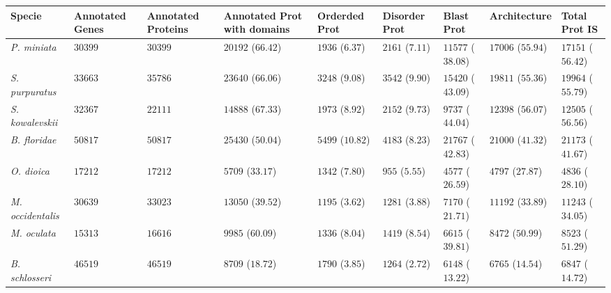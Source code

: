 \documentclass[11pt]{article}
\begin{document}
\begin{table}
\small
\centering
\begin{tabular}{p{3.2cm}p{2cm}p{2cm}p{2cm}p{2cm}p{2cm}p{2.1cm}p{2.7cm}p{2.6cm}}
\toprule
\textbf{Specie}&\textbf{Annotated Genes}&\textbf{Annotated Proteins}&\textbf{Annotated Prot with domains}&\textbf{Orderded Prot}&\textbf{Disorder Prot}&\textbf{Blast Prot}&\textbf{Architecture}&\textbf{Total Prot IS} \\ 
\midrule
\textsl{P. miniata}&$30399$&$30399$&$20192$ ($66.42$)&$1936$ ($6.37$)&$2161$ ($7.11$)&$11577$ ($38.08$)&$17006$ ($55.94$)&$17151$ ($56.42$)\\
\textsl{S. purpuratus}&$33663$&$35786$&$23640$ ($66.06$)&$3248$ ($9.08$)&$3542$ ($9.90$)&$15420$ ($43.09$)&$19811$ ($55.36$)&$19964$ ($55.79$)\\
\textsl{S. kowalevskii}&$32367$&$22111$&$14888$ ($67.33$)&$1973$ ($8.92$)&$2152$ ($9.73$)&$9737$ ($44.04$)&$12398$ ($56.07$)&$12505$ ($56.56$)\\
\midrule
\textsl{B. floridae}&$50817$&$50817$&$25430$ ($50.04$)&$5499$ ($10.82$)&$4183$ ($8.23$)&$21767$ ($42.83$)&$21000$ ($41.32$)&$21173$ ($41.67$)\\
\midrule
\textsl{O. dioica}&$17212$&$17212$&$5709$ ($33.17$)&$1342$ ($7.80$)&$955$ ($5.55$)&$4577$ ($26.59$)&$4797$ ($27.87$)&$4836$ ($28.10$)\\
\textsl{M. occidentalis}&$30639$&$33023$&$13050$ ($39.52$)&$1195$ ($3.62$)&$1281$ ($3.88$)&$7170$ ($21.71$)&$11192$ ($33.89$)&$11243$ ($34.05$)\\
\textsl{M. oculata}&$15313$&$16616$&$9985$ ($60.09$)&$1336$ ($8.04$)&$1419$ ($8.54$)&$6615$ ($39.81$)&$8472$ ($50.99$)&$8523$ ($51.29$)\\
\textsl{B. schlosseri}&$46519$&$46519$&$8709$ ($18.72$)&$1790$ ($3.85$)&$1264$ ($2.72$)&$6148$ ($13.22$)&$6765$ ($14.54$)&$6847$ ($14.72$)\\


\end{tabular}
\end{table}
\end{document}
